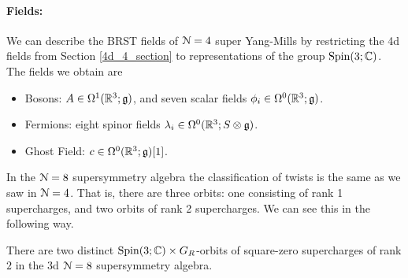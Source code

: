 \documentclass[10pt, oneside]{article}
\begin{document}
\vspace{-10pt}
\paragraph{Fields:} We can describe the BRST fields of $\mathcal{N}=4$ super Yang-Mills by restricting the 4d fields from Section \ref{4d_4_section} to representations of the group $\mathrm{Spin}(3;\mathbb C)$.  The fields we obtain are
\begin{itemize}
 \item Bosons: $A \in \Omega^1(\mathbb R^3; \mathfrak{g})$, and seven scalar fields $\phi_i \in \Omega^0(\mathbb R^3; \mathfrak{g})$.
 \item Fermions: eight spinor fields $\lambda_i \in \Omega^0(\mathbb R^3; S \otimes \mathfrak{g})$.
 \item Ghost Field: $c \in \Omega^0(\mathbb R^3;\mathfrak{g})[1]$.
\end{itemize}

In the $\mathcal{N}=8$ supersymmetry algebra the classification of twists is the same as we saw in $\mathcal{N}=4$.  That is, there are three orbits: one consisting of rank 1 supercharges, and two orbits of rank 2 supercharges.  We can see this in the following way.
\begin{lemma}
There are two distinct $\mathrm{Spin}(3;\mathbb C) \times G_R$-orbits of square-zero supercharges of rank $2$ in the 3d $\mathcal{N}=8$ supersymmetry algebra.
\end{lemma}
\end{document}
